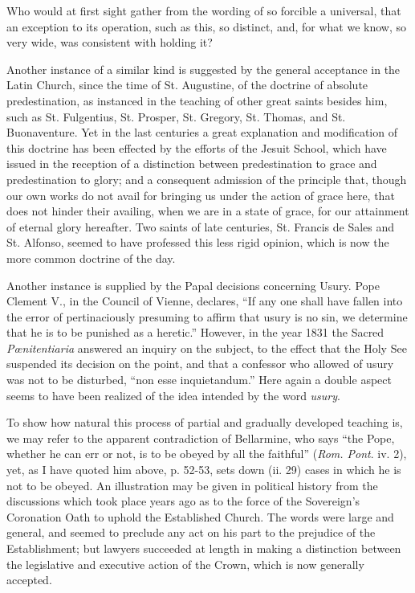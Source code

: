 Who would at first sight gather from the wording of so forcible a
universal, that an exception to its operation, such as this, so
distinct, and, for what we know, so very wide, was consistent with
holding it?

Another instance of a similar kind is suggested by the general
acceptance in the Latin Church, since the time of St. Augustine, of the
doctrine of absolute predestination, as instanced in the teaching of
other great saints besides him, such as St. Fulgentius, St. Prosper, St.
Gregory, St. Thomas, and St. Buonaventure. Yet in the last centuries a
great explanation and modification of this doctrine has been effected by
the efforts of the Jesuit School, which have issued in the reception of
a distinction between predestination to grace and predestination to
glory; and a consequent admission of the principle that, though our own
works do not avail for bringing us under the action of grace here, that
does not hinder their availing, when we are in a state of grace, for our
attainment of eternal glory hereafter. Two saints of late centuries, St.
Francis de Sales and St. Alfonso, seemed to have professed this less
rigid opinion, which is now the more common doctrine of the day.

Another instance is supplied by the Papal decisions concerning Usury.
Pope Clement V., in the Council of Vienne, declares, ``If any one
shall have fallen into the error of pertinaciously presuming to affirm
that usury is no sin, we determine that he is to be punished as a
heretic.'' However, in the year 1831 the Sacred \emph{Pœnitentiaria}
answered an inquiry on the subject, to the effect that the Holy See
suspended its decision on the point, and that a confessor who allowed of
usury was not to be disturbed, ``non esse inquietandum.'' Here
again a double aspect seems to have been realized of the idea intended
by the word \emph{usury}.

To show how natural this process of partial and gradually developed
teaching is, we may refer to the apparent contradiction of Bellarmine,
who says ``the Pope, whether he can err or not, is to be obeyed by
all the faithful'' (\emph{Rom. Pont}. iv. 2), yet, as I have quoted
him above, p. 52-53, sets down (ii. 29) cases in which he is not to be
obeyed. An illustration may be given in political history from the
discussions which took place years ago as to the force of the
Sovereign's Coronation Oath to uphold the Established Church. The words
were large and general, and seemed to preclude any act on his part to
the prejudice of the Establishment; but lawyers succeeded at length in
making a distinction between the legislative and executive action of the
Crown, which is now generally accepted.

